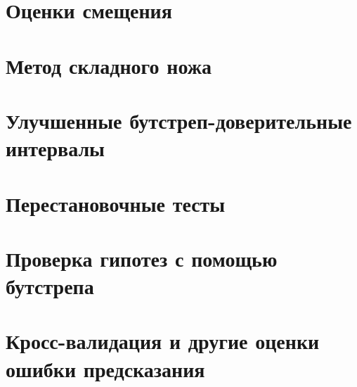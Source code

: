 \documentclass[12pt,a4paper,final]{report}
\begin{document}
\setcounter{chapter}{9}
\chapter{Оценки смещения}







\chapter{Метод складного ножа}








\setcounter{chapter}{13}
\chapter{Улучшенные бутстреп-доверительные интервалы}






\chapter{Перестановочные тесты}






\chapter{Проверка гипотез с помощью бутстрепа}







\chapter{Кросс-валидация и другие оценки ошибки предсказания}








\end{document}
